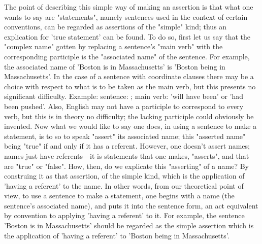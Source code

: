 \documentclass[10pt,twoside]{memoir}
\begin{document}
\begin{enumerate}
The point of describing this simple way of making an assertion is that 
what one wants to say are "statements", namely sentences used in the 
context of certain conventions, can be regarded as assertions of the "simple" 
kind; thus an explication for 'true statement' can be found. To do so, first 
let us say that the "complex name" gotten by replacing a sentence's "main 
verb" with the corresponding participle is the "associated name" of the 
sentence. For example, the associated name of 'Boston is in Massachusetts' is 
'Boston being in Massachusetts'. In the case of a sentence with coordinate 
clauses there may be a choice with respect to what is to be taken as the main 
verb, but this presents no significant difficulty. Example: sentence: ; main verb: 'will have been' or 'had been 
pushed'. Also, English may not have a participle to correspond to every verb, 
but this is in theory no difficulty; the lacking participle could obviously be 
invented. Now what we would like to say one does, in using a sentence to 
make a statement, is to so to speak "assert" its associated name; this 
"asserted name" being "true" if and only if it has a referent. However, one 
doesn't assert names; names just have referents---it is statements that one 
makes, "asserts", and that are "true" or "false". How, then, do we explicate 
this "asserting" of a name? By construing it as that assertion, of the simple 
kind, which is the application of 'having a referent' to the name. In other 
words, from our theoretical point of view, to use a sentence to make a 
statement, one begins with a name (the sentence's associated name), and 
puts it into the sentence form, an act equivalent by convention to applying 
'having a referent' to it. For example, the sentence 'Boston is in 
Massachusetts' should be regarded as the simple assertion which is the 
application of 'having a referent' to 'Boston being in Massachusetts'. 


\end{enumerate}
\end{document}
